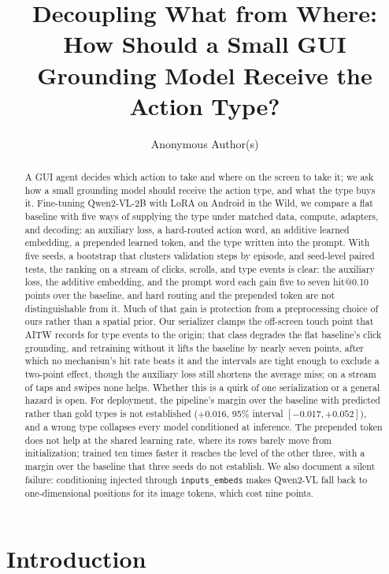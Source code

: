 \documentclass{article}
\title{Decoupling What from Where: How Should a Small GUI Grounding Model Receive the Action Type?}
\author{Anonymous Author(s)}
\makeatletter
\newcommand{\hitat}[1]{hit@#1}
\makeatother
\begin{document}
\maketitle

\begin{abstract}
A GUI agent decides which action to take and where on the screen to take it; we ask how a small grounding model should receive the action type, and what the type buys it. Fine-tuning Qwen2-VL-2B with LoRA on Android in the Wild, we compare a flat baseline with five ways of supplying the type under matched data, compute, adapters, and decoding: an auxiliary loss, a hard-routed action word, an additive learned embedding, a prepended learned token, and the type written into the prompt. With five seeds, a bootstrap that clusters validation steps by episode, and seed-level paired tests, the ranking on a stream of clicks, scrolls, and type events is clear: the auxiliary loss, the additive embedding, and the prompt word each gain five to seven \hitat{0.10} points over the baseline, and hard routing and the prepended token are not distinguishable from it. Much of that gain is protection from a preprocessing choice of ours rather than a spatial prior. Our serializer clamps the off-screen touch point that AITW records for type events to the origin; that class degrades the flat baseline's click grounding, and retraining without it lifts the baseline by nearly seven points, after which no mechanism's hit rate beats it and the intervals are tight enough to exclude a two-point effect, though the auxiliary loss still shortens the average miss; on a stream of taps and swipes none helps. Whether this is a quirk of one serialization or a general hazard is open. For deployment, the pipeline's margin over the baseline with predicted rather than gold types is not established ($+0.016$, 95\% interval $[-0.017, +0.052]$), and a wrong type collapses every model conditioned at inference. The prepended token does not help at the shared learning rate, where its rows barely move from initialization; trained ten times faster it reaches the level of the other three, with a margin over the baseline that three seeds do not establish. We also document a silent failure: conditioning injected through \texttt{inputs\_embeds} makes Qwen2-VL fall back to one-dimensional positions for its image tokens, which cost nine points.
\end{abstract}

\section{Introduction}
\label{sec:intro}
\end{document}
